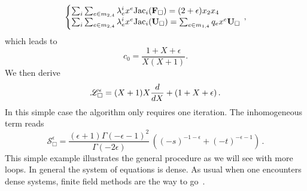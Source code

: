 \documentclass[a4paper,12pt]{article}
\numberwithin{equation}{section}
\numberwithin{figure}{section}
\begin{document}
%
\begin{equation}\label{e:sysCFU-Box}
	\left\{\begin{array}{@{}l@{}}
\sum_i \sum_{e \in m_{2,4}} \lambda^i_e x^e \text{Jac}_i(\mathbf F_\Box) 
		=    (2+\epsilon) x_2 x_4\\
\sum_i\sum_{e \in m_{2,4}} \lambda^i_e x^e \text{Jac}_i(\mathbf U_\Box) = \sum_{e\in m_{1,4}} q_e x^e \textbf{U}_\Box 
	\end{array}\right.\,,
\end{equation}
which leads to 
%
\begin{equation}
	c_0= \frac{1+X+\epsilon }{X(X+1)}.
\end{equation}
We then derive
\begin{equation}\label{e:PFBox}
	\mathscr{L}_\Box^\epsilon= (X+1) X {d\over dX}+(1+X+\epsilon)  \,.
\end{equation}
In this simple case the algorithm only requires one iteration. 
The inhomogeneous term reads
\begin{equation}\label{e:SourceBox}
	\mathscr{S}_\Box^\epsilon=\frac{(\epsilon +1)\Gamma (-\epsilon -1)^2 }{\Gamma
		(-2 \epsilon )}  \, \left( (-s)^{-1-\epsilon }+(-t)^{-\epsilon -1}\right) \, .
\end{equation}
This simple example illustrates the general procedure as we will see with more loops. In general the system of equations is dense. As usual when one encounters dense  systems, finite field methods are the way to go~\cite{Peraro:2019svx}.
\end{document}
